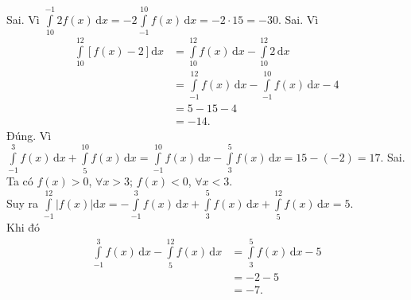 \begin{ex}
{		\begin{itemchoice}
			\itemch Sai. Vì $ \displaystyle \int\limits_{10}^{-1} 2f(x) \mathrm{\,d}x = -2\int\limits_{-1}^{10} f(x) \mathrm{\,d}x = -2\cdot 15=-30$.
			\itemch Sai. Vì 
			\begin{align*}
				\displaystyle \int\limits_{10}^{12} \left[f(x)-2\right] \mathrm{d}x &= \int\limits_{10}^{12} f(x) \mathrm{\,d}x - \int\limits_{10}^{12} 2 \mathrm{\,d}x \\
				&= \int\limits_{-1}^{12} f(x) \mathrm{\,d}x - \int\limits_{-1}^{10} f(x) \mathrm{\,d}x - 4 \\
				&= 5-15-4 \\
				&= -14.
			\end{align*}
			\itemch Đúng. Vì $\displaystyle \int\limits_{-1}^{3} f(x) \mathrm{\,d}x + \int\limits_{5}^{10} f(x) \mathrm{\,d}x = \int\limits_{-1}^{10} f(x) \mathrm{\,d}x - \int\limits_{3}^{5} f(x) \mathrm{\,d}x = 15 - (-2) = 17$.
			\itemch Sai.\\
			Ta có $f(x)>0$, $\forall x>3$; $f(x)<0$, $\forall x<3$.\\
			Suy ra $\displaystyle \int\limits_{-1}^{12} \left|f(x)\right|\mathrm{d}x= -\int\limits_{-1}^{3} f(x)\mathrm{\,d}x+\int\limits_{3}^{5} f(x)\mathrm{\,d}x + \int\limits_{5}^{12} f(x)\mathrm{\,d}x=5$.\\
			Khi đó\\
			\begin{align*}
				\displaystyle \int\limits_{-1}^{3} f(x) \mathrm{\,d}x -  \int\limits_{5}^{12} f(x) \mathrm{\,d}x &=  \int\limits_{3}^{5} f(x) \mathrm{\,d}x - 5\\
				&= -2-5 \\
				&= -7.
			\end{align*}
		\end{itemchoice}
	}
\end{ex}
